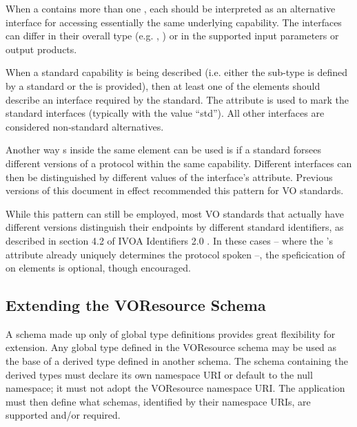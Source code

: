 \documentclass[11pt,a4paper]{ivoa}
\begin{document}
When a  contains more than one
, each  should be
interpreted as an alternative interface for accessing essentially the
same underlying capability.  The interfaces can differ in their
overall type (e.g. ,
) or in the supported input parameters or
output products.  


When a standard capability is being described (i.e. either the
 sub-type is defined by a standard or the
 is provided), then at least one of the
 elements should describe an interface required
by the standard.  The  attribute is used to mark the
standard interfaces (typically with the value ``std'').
All other interfaces are considered non-standard
alternatives.


Another way s inside the same
 element can be used is if a standard forsees
different versions of a protocol within the same capability.  Different
interfaces can then be distinguished by different values of the
interface's  attribute.  Previous versions of this
document in effect recommended this pattern for VO standards.

While this pattern can still be employed, most VO standards that
actually have different versions distinguish their endpoints by
different standard identifiers, as described in section 4.2 of IVOA
Identifiers 2.0 \citep{std:identifiers2}.  In these cases -- where the
's  attribute already uniquely
determines the protocol spoken --, the speficication of 
on  elements is optional, though encouraged.

\subsection{Extending the VOResource Schema}

\label{sect:extending}

A schema made up only of global type definitions provides great
flexibility for extension.  Any global type defined in the VOResource
schema may be used as the base of a derived type defined in another
schema.  The schema containing the derived types must declare its own
namespace URI or default to the null namespace; it must not adopt the
VOResource namespace URI.  The application must then define what
schemas, identified by their namespace URIs, are supported and/or
required.  
\end{document}
